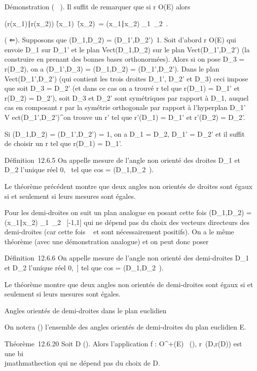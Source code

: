 \documentclass[]{article}
\begin{document}
Démonstration ( \rigtharrow~). Il suffit de remarquer que si r \in O(E) alors


(r(x_1)∣r(x_2))
\over
\r(x_1)\
\r(x_2)\
=
(x_1∣x_2)
\over
\x_1\
\x_2\ .

( ⇐). Supposons que \phi(D_1,D_2) =
\phi(D_1',D_2')\neq~1. Soit
d'abord r \in O(E) qui envoie D_1 sur D_1' et le plan
Vect(D_1,D_2) sur le plan
Vect(D_1',D_2') (la construire en prenant des bonnes
bases orthonormées). Alors si on pose D_3 = r(D_2), on
a \phi(D_1',D_3) = \phi(D_1,D_2) =
\phi(D_1',D_2'). Dans le plan
Vect(D_1',D_2') (qui contient les trois droites
D_1', D_2' et D_3) ceci impose que soit
D_3 = D_2' (et dans ce cas on a trouvé r tel que
r(D_1) = D_1' et r(D_2) = D_2'),
soit D_3 et D_2' sont symétriques par rapport à
D_1, auquel cas en composant r par la symétrie orthogonale par
rapport à l'hyperplan D_1' \oplus~ V
ect(D_1',D_2')^\bot on trouve un r' tel que
r'(D_1) = D_1' et r'(D_2) = D_2'.

Si \phi(D_1,D_2) = \phi(D_1',D_2') = 1, on
a D_1 = D_2, D_1' = D_2' et il
suffit de choisir un r tel que r(D_1) = D_1'.

Définition~12.6.5 On appelle mesure de l'angle non orienté des droites
D_1 et D_2 l'unique réel \theta \in {[}0,\pi~\diagup2{]} tel que
cos \theta = \phi(D_1,D_2~).

Le théorème précédent montre que deux angles non orientés de droites
sont égaux si et seulement si leurs mesures sont égales.

Pour les demi-droites on suit un plan analogue en posant cette fois
\phi(D_1,D_2) =
(x_1∣x_2)
\over
\x_1\
\x_2\ \in
{[}-1,1{]} qui ne dépend pas du choix des vecteurs directeurs des
demi-droites (car cette fois \lambda~ et \mu sont nécessairement positifs). On a
le même théorème (avec une démonstration analogue) et on peut donc poser

Définition~12.6.6 On appelle mesure de l'angle non orienté des
demi-droites D_1 et D_2 l'unique réel \theta \in {[}0,\pi~{]}
tel que cos \theta = \phi(D_1,D_2~).

Le théorème montre que deux angles non orientés de demi-droites sont
égaux si et seulement si leurs mesures sont égales.

Angles orientés de demi-droites dans le plan euclidien

On notera \tildeA() l'ensemble des angles orientés
de demi-droites du plan euclidien E.

Théorème~12.6.20 Soit D \in\tildeD(). Alors
l'application f : O^+(E) \rightarrow~\tildeA(\mathcal{E}),
r\mapsto~\widehat(D,r(D)) est une
bi\\jmathmathection qui ne dépend pas du choix de D.
\end{document}

